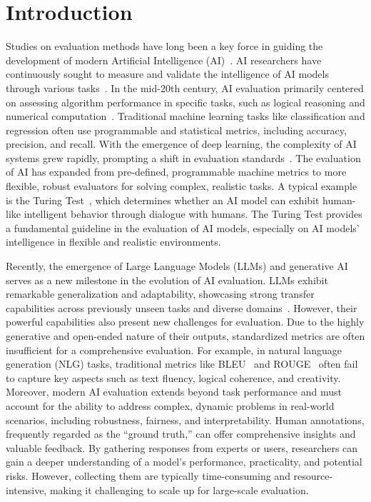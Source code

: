 \section{Introduction}

Studies on evaluation methods have long been a key force in guiding the development of modern Artificial Intelligence (AI)~\cite{chang2024survey}. 
AI researchers have continuously sought to measure and validate the intelligence of AI models through various tasks~\cite{chang2024survey,guo2023evaluating}.
In the mid-20th century, AI evaluation primarily centered on assessing algorithm performance in specific tasks, such as logical reasoning and numerical computation~\cite{nilsson2014principles}. 
Traditional machine learning tasks like classification and regression often use programmable and statistical metrics, including accuracy, precision, and recall. 
With the emergence of deep learning, the complexity of AI systems grew rapidly, prompting a shift in evaluation standards~\cite{lecun2015deep}. 
The evaluation of AI has expanded from pre-defined, programmable machine metrics to more flexible, robust evaluators for solving complex, realistic tasks.
A typical example is the Turing Test~\cite{french2000turing,turing2009computing}, which determines whether an AI model can exhibit human-like intelligent behavior through dialogue with humans. 
The Turing Test provides a fundamental guideline in the evaluation of AI models, especially on AI models' intelligence in flexible and realistic environments. 

 
Recently, the emergence of Large Language Models (LLMs) and generative AI serves as a new milestone in the evolution of AI evaluation.
LLMs exhibit remarkable generalization and adaptability, showcasing strong transfer capabilities across previously unseen tasks and diverse domains~\cite{achiam2023gpt,bai2023qwen}. However, their powerful capabilities also present new challenges for evaluation. 
Due to the highly generative and open-ended nature of their outputs, standardized metrics are often insufficient for a comprehensive evaluation.
For example, in natural language generation (NLG) tasks, traditional metrics like BLEU~\cite{papineni2002bleu} and ROUGE~\cite{lin2004rouge} often fail to capture key aspects such as text fluency, logical coherence, and creativity. Moreover, modern AI evaluation extends beyond task performance and must account for the ability to address complex, dynamic problems in real-world scenarios, including robustness, fairness, and interpretability.
Human annotations, frequently regarded as the ``ground truth,'' can offer comprehensive insights and valuable feedback. By gathering responses from experts or users, researchers can gain a deeper understanding of a model's performance, practicality, and potential risks. However, collecting them are typically time-consuming and resource-intensive, making it challenging to scale up for large-scale evaluation.


